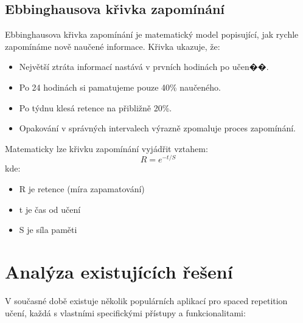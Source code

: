 \documentclass[12pt, a4paper, twoside, openright]{report}
\begin{document}
	\subsection{Ebbinghausova křivka zapomínání}
	Ebbinghausova křivka zapomínání je matematický model popisující, jak rychle zapomínáme nově naučené informace. Křivka ukazuje, že:
	\begin{itemize}
		\item Největší ztráta informací nastává v prvních hodinách po učen��.
		\item Po 24 hodinách si pamatujeme pouze 40\% naučeného.
		\item Po týdnu klesá retence na přibližně 20\%.
		\item Opakování v správných intervalech výrazně zpomaluje proces zapomínání.
	\end{itemize}

	Matematicky lze křivku zapomínání vyjádřit vztahem:
	\begin{equation}
		R = e^{-t/S}
	\end{equation}
	kde:
	\begin{itemize}
		\item R je retence (míra zapamatování)
		\item t je čas od učení
		\item S je síla paměti
	\end{itemize}

	\section{Analýza existujících řešení}
	V současné době existuje několik populárních aplikací pro spaced repetition učení, každá s vlastními specifickými přístupy a funkcionalitami:
\end{document}
